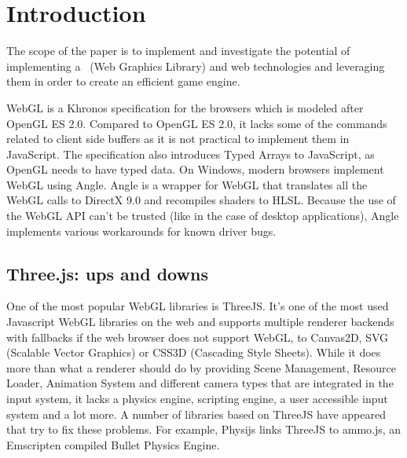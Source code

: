 \chapter{Introduction}
\label{chapter:intro}

The scope of the paper is to implement and investigate the potential of implementing a
\project\ (Web Graphics Library) and web technologies and leveraging them in order to create an efficient game engine.

WebGL is a Khronos specification for the browsers which is modeled after OpenGL ES 2.0. Compared to OpenGL ES 2.0, it lacks some of the commands related to client side buffers as it is not practical to implement them in JavaScript. The specification also introduces Typed Arrays to JavaScript, as OpenGL needs to have typed data. On Windows, modern browsers implement WebGL using Angle. Angle is a wrapper for WebGL that translates all the WebGL calls to DirectX 9.0 and recompiles shaders to HLSL. Because the use of the WebGL API can't be trusted (like in the case of desktop applications), Angle implements various workarounds for known driver bugs.


\section{Three.js: ups and downs}
\label{sec: ThreeJs}

One of the most popular WebGL libraries is ThreeJS. It’s one of the most used Javascript WebGL libraries on the web and supports multiple renderer backends with fallbacks if the web browser does not support WebGL, to Canvas2D, SVG (Scalable Vector Graphics) or CSS3D (Cascading Style Sheets). 
While it does more than what a renderer should do by providing Scene Management,
Resource Loader, Animation System and different camera types that are integrated in the
input system, it lacks a physics engine, scripting engine, a user accessible input system and a lot more.
A number of libraries based on ThreeJS have appeared that try to fix these problems. For example, Physijs links ThreeJS to ammo.js, an Emscripten compiled Bullet Physics Engine.


